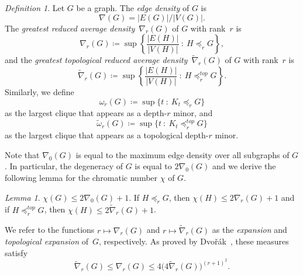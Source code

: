 \documentclass[1p,number,a4paper]{elsarticle}
\theoremstyle{remark}
\newcommand{\minor}{\preccurlyeq}
\newtheorem{definition}[theorem]{Definition}
\newtheorem{lemma}[theorem]{Lemma}
\begin{document}


\begin{definition}
Let $G$ be a graph. The \emph{edge density} of $G$ is
\[\nabla(G)=|E(G)|/|V(G)|.\] 
The \emph{greatest reduced average density}~$\nabla_r(G)$  of $G$ with rank~$r$ is 
\[\nabla_r(G)\coloneqq \sup\left\{\frac{|E(H)|}{|V(H)|}\ \colon\ H\minor_r G\right\},\]
and the \emph{greatest topological reduced average density}~$\widetilde{\nabla}_r(G)$  of $G$ with rank~$r$ is 
\[\widetilde{\nabla}_r(G)\coloneqq \sup\left\{\frac{|E(H)|}{|V(H)|}\ \colon\ H\minor_r^{top} G\right\}.\]
Similarly, we define 
\[\omega_r(G)\coloneqq \sup \{t\ \colon\ K_t\minor_r G\}\]
as the largest clique that appears as a depth-$r$ minor, and 
\[\widetilde{\omega}_r(G)\coloneqq \sup \{t\ \colon\ K_t\minor_r^{top} G\}\]
as the largest clique that appears as a topological depth-$r$ minor.
\end{definition}

Note that $\nabla_0(G)$ is equal to the maximum edge density over all subgraphs of $G$. In particular, the degeneracy of $G$ is equal to $2\nabla_0(G)$ and we derive the following lemma for the chromatic number $\chi$ of $G$. 
\begin{lemma}\label{lem:chromatic}
  $\chi(G)\leq 2\nabla_0(G)+1$. If $H\minor_r G$, then $\chi(H)\leq 2\nabla_r(G)+1$ and if $H\minor_r^{top}G$, then $\chi(H)\leq 2\widetilde{\nabla}_r(G)+1$. 
\end{lemma}

We refer to the functions 
$r \mapsto \nabla_r(G)$ and $r \mapsto \widetilde\nabla_r(G)$ as the \emph{expansion} and \emph{topological expansion} of~$G$, respectively.
As proved by Dvo\v{r}\'ak~\cite{dvovrak2007asymptotical}, these measures 
satisfy \[\widetilde\nabla_r(G)\leq \nabla_r(G)\leq 4\big(4\widetilde\nabla_r(G)\big)^{(r+1)^2}.\]
\end{document}
